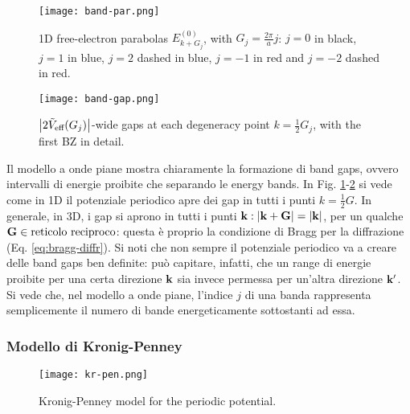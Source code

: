 \begin{figure}
	\centering
	\texttt{[image: band-par.png]}
	\caption{1D free-electron parabolas $ E_{k + G_j}^{(0)} $, with $ G_j = \frac{2\pi}{a} j $: $ j = 0 $ in black, $ j = 1 $ in blue, $ j = 2 $ dashed in blue, $ j = -1 $ in red and $ j = -2 $ dashed in red.}
	\label{band-par}
\end{figure}
\begin{figure}
	\centering
	\texttt{[image: band-gap.png]}
	\caption{$ \left\lvert2\tilde{V}_\text{eff}(G_j)\right\rvert $-wide gaps at each degeneracy point $ k = \frac{1}{2} G_j $, with the first BZ in detail.}
	\label{band-gap}
\end{figure}

Il modello a onde piane mostra chiaramente la formazione di band gaps, ovvero intervalli di energie proibite che separando le energy bands. In Fig. \ref{band-par}-\ref{band-gap} si vede come in 1D il potenziale periodico apre dei gap in tutti i punti $ k = \frac{1}{2} G $. In generale, in 3D, i gap si aprono in tutti i punti $ \mathbf{k} : \left\lvert\mathbf{k} + \mathbf{G}\right\rvert = \left\lvert\mathbf{k}\right\rvert $, per un qualche $ \mathbf{G} \in \text{reticolo reciproco} $: questa è proprio la condizione di Bragg per la diffrazione (Eq. \ref{eq:bragg-diffr}). Si noti che non sempre il potenziale periodico va a creare delle band gaps ben definite: può capitare, infatti, che un range di energie proibite per una certa direzione $ \mathbf{k} $ sia invece permessa per un'altra direzione $ \mathbf{k}' $. \\
Si vede che, nel modello a onde piane, l'indice $ j $ di una banda rappresenta semplicemente il numero di bande energeticamente sottostanti ad essa.

\subsubsection{Modello di Kronig-Penney}

\begin{figure}[!b]
	\centering
	\texttt{[image: kr-pen.png]}
	\caption{Kronig-Penney model for the periodic potential.}
	\label{kr-pen}
\end{figure}

